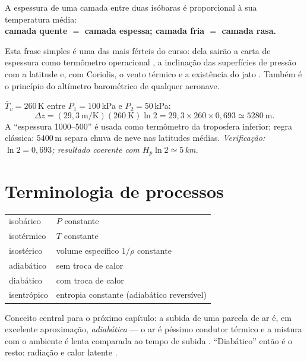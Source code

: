 \documentclass[11pt]{article}
\begin{document}
\begin{noquadro}
A espessura de uma camada entre duas isóbaras é proporcional à sua
temperatura média:\\
\textbf{camada quente $=$ camada espessa; camada fria $=$ camada rasa.}
\end{noquadro}

Esta frase simples é uma das mais férteis do curso: dela sairão a carta de
espessura como termômetro operacional , a
inclinação das superfícies de pressão com a latitude e, com Coriolis, o vento
térmico e a existência do jato . Também é o
princípio do altímetro barométrico de qualquer aeronave.

\begin{exemplo}
$\bar T_v = 260$\,K entre $P_1=100$\,kPa e $P_2=50$\,kPa:
\[ \Delta z = (29{,}3\ \mathrm{m/K})(260\ \mathrm{K})\ln 2
 = 29{,}3\times260\times0{,}693 \simeq 5280\ \mathrm{m}. \]
A ``espessura 1000--500'' é usada como termômetro da troposfera inferior;
regra clássica: $5400$\,m separa chuva de neve nas latitudes médias.
\emph{Verificação: $\ln 2=0{,}693$; resultado coerente com
$H_p\ln 2\simeq5$\,km.}
\end{exemplo}

\section{Terminologia de processos}\label{sec:processos}


\begin{noquadro}
\begin{tabular}{ll}
isobárico & $P$ constante \\
isotérmico & $T$ constante \\
isostérico & volume específico $1/\rho$ constante \\
adiabático & sem troca de calor \\
diabático & com troca de calor \\
isentrópico & entropia constante (adiabático reversível) \\
\end{tabular}
\end{noquadro}

Conceito central para o próximo capítulo: a subida de uma parcela de ar é,
em excelente aproximação, \emph{adiabática} — o ar é péssimo condutor
térmico e a mistura com o ambiente é lenta comparada ao tempo de subida
. ``Diabático'' então é o resto:
radiação  e calor latente
 .
\end{document}
